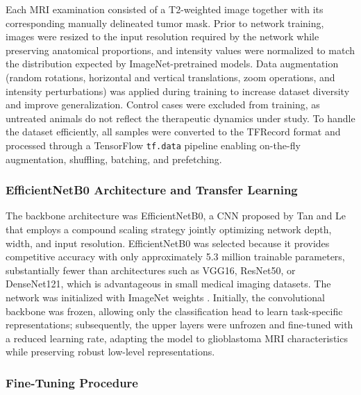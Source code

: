 \documentclass{article}
\begin{document}
Each MRI examination consisted of a T2-weighted image together with its corresponding manually delineated tumor mask. Prior to network training, images were resized to the input resolution required by the network while preserving anatomical proportions, and intensity values were normalized to match the distribution expected by ImageNet-pretrained models. Data augmentation (random rotations, horizontal and vertical translations, zoom operations, and intensity perturbations) was applied during training to increase dataset diversity and improve generalization. Control cases were excluded from training, as untreated animals do not reflect the therapeutic dynamics under study. To handle the dataset efficiently, all samples were converted to the TFRecord format and processed through a TensorFlow \texttt{tf.data} pipeline enabling on-the-fly augmentation, shuffling, batching, and prefetching.

\subsubsection{EfficientNetB0 Architecture and Transfer Learning}

The backbone architecture was EfficientNetB0, a CNN proposed by Tan and Le \cite{tan2020efficientnetrethinkingmodelscaling} that employs a compound scaling strategy jointly optimizing network depth, width, and input resolution. EfficientNetB0 was selected because it provides competitive accuracy with only approximately 5.3 million trainable parameters, substantially fewer than architectures such as VGG16, ResNet50, or DenseNet121, which is advantageous in small medical imaging datasets. The network was initialized with ImageNet weights \cite{deng2009}. Initially, the convolutional backbone was frozen, allowing only the classification head to learn task-specific representations; subsequently, the upper layers were unfrozen and fine-tuned with a reduced learning rate, adapting the model to glioblastoma MRI characteristics while preserving robust low-level representations.

\subsubsection{Fine-Tuning Procedure}
\end{document}
